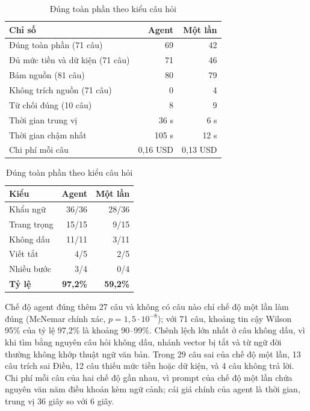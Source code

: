 \begin{table}[H]
\centering
\footnotesize
\setlength{\tabcolsep}{3pt}
\begin{minipage}[t]{0.6\textwidth}
\centering
\caption{Kết quả câu trả lời cuối trên 81 câu}
\label{tab:ch5-ket-qua-tra-loi}
\begin{tabularx}{\linewidth}{@{}>{\raggedright\arraybackslash}X r r@{}}
\toprule
\textbf{Chỉ số} & \textbf{Agent} & \textbf{Một lần} \\
\midrule
Đúng toàn phần (71 câu) & 69 & 42 \\
Đủ mức tiền và dữ kiện (71 câu) & 71 & 46 \\
Bám nguồn (81 câu) & 80 & 79 \\
Không trích nguồn (71 câu) & 0 & 4 \\
Từ chối đúng (10 câu) & 8 & 9 \\
Thời gian trung vị & 36 s & 6 s \\
Thời gian chậm nhất & 105 s & 12 s \\
Chi phí mỗi câu & 0,16 USD & 0,13 USD \\
\bottomrule
\end{tabularx}
\end{minipage}\hfill
\begin{minipage}[t]{0.37\textwidth}
\centering
\caption{Đúng toàn phần theo kiểu câu hỏi}
\label{tab:ch5-theo-kieu}
\begin{tabularx}{\linewidth}{@{}>{\raggedright\arraybackslash}X r r@{}}
\toprule
\textbf{Kiểu} & \textbf{Agent} & \textbf{Một lần} \\
\midrule
Khẩu ngữ & 36/36 & 28/36 \\
Trang trọng & 15/15 & 9/15 \\
Không dấu & 11/11 & 3/11 \\
Viết tắt & 4/5 & 2/5 \\
Nhiều bước & 3/4 & 0/4 \\
\midrule
\textbf{Tỷ lệ} & \textbf{97,2\%} & \textbf{59,2\%} \\
\bottomrule
\end{tabularx}
\end{minipage}
\end{table}

Chế độ agent đúng thêm 27 câu và không có câu nào chỉ chế độ một lần làm đúng (McNemar chính xác, $p = 1{,}5\cdot10^{-8}$); với 71 câu, khoảng tin cậy Wilson 95\% của tỷ lệ 97,2\% là khoảng 90--99\%. Chênh lệch lớn nhất ở câu không dấu, vì khi tìm bằng nguyên câu hỏi không dấu, nhánh vector bị tắt và từ ngữ đời thường không khớp thuật ngữ văn bản. Trong 29 câu sai của chế độ một lần, 13 câu trích sai Điều, 12 câu thiếu mức tiền hoặc dữ kiện, và 4 câu không trả lời. Chi phí mỗi câu của hai chế độ gần nhau, vì prompt của chế độ một lần chứa nguyên văn năm điều khoản kèm ngữ cảnh; cái giá chính của agent là thời gian, trung vị 36 giây so với 6 giây.

